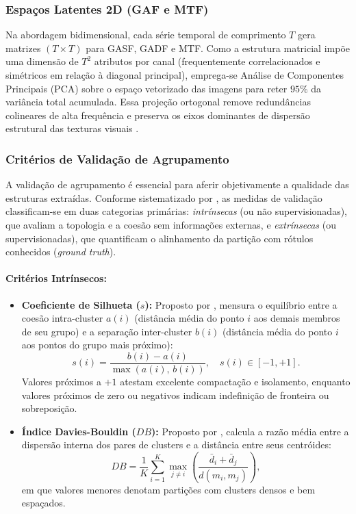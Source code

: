 \subsubsection{Espaços Latentes 2D (GAF e MTF)}

Na abordagem bidimensional, cada série temporal de comprimento $T$ gera matrizes $(T \times T)$ para GASF, GADF e MTF. Como a estrutura matricial impõe uma dimensão de $T^2$ atributos por canal (frequentemente correlacionados e simétricos em relação à diagonal principal), emprega-se Análise de Componentes Principais (PCA) sobre o espaço vetorizado das imagens para reter $95\%$ da variância total acumulada. Essa projeção ortogonal remove redundâncias colineares de alta frequência e preserva os eixos dominantes de dispersão estrutural das texturas visuais \cite{wu2023imaging}.

\subsubsection{Critérios de Validação de Agrupamento}

A validação de agrupamento é essencial para aferir objetivamente a qualidade das estruturas extraídas. Conforme sistematizado por \cite{tan2019introduction}, as medidas de validação classificam-se em duas categorias primárias: \textit{intrínsecas} (ou não supervisionadas), que avaliam a topologia e a coesão sem informações externas, e \textit{extrínsecas} (ou supervisionadas), que quantificam o alinhamento da partição com rótulos conhecidos (\textit{ground truth}).

\paragraph{Critérios Intrínsecos:}
\begin{itemize}
    \item \textbf{Coeficiente de Silhueta ($s$):} Proposto por \cite{rousseeuw1987silhouettes}, mensura o equilíbrio entre a coesão intra-cluster $a(i)$ (distância média do ponto $i$ aos demais membros de seu grupo) e a separação inter-cluster $b(i)$ (distância média do ponto $i$ aos pontos do grupo mais próximo):
    \begin{equation}
    s(i) = \frac{b(i) - a(i)}{\max(a(i),\, b(i))}, \quad s(i) \in [-1, +1].
    \end{equation}
    Valores próximos a $+1$ atestam excelente compactação e isolamento, enquanto valores próximos de zero ou negativos indicam indefinição de fronteira ou sobreposição.
    \item \textbf{Índice Davies-Bouldin ($DB$):} Proposto por \cite{davies1979cluster}, calcula a razão média entre a dispersão interna dos pares de clusters e a distância entre seus centróides:
    \begin{equation}
    DB = \frac{1}{K} \sum_{i=1}^K \max_{j \ne i} \left( \frac{\bar{d}_i + \bar{d}_j}{d(m_i, m_j)} \right),
    \end{equation}
    em que valores menores denotam partições com clusters densos e bem espaçados.
\end{itemize}

